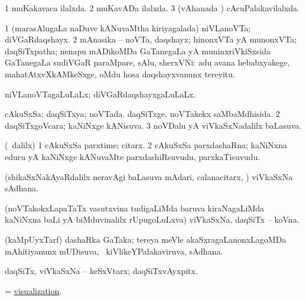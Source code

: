 \bentry
{} 
\gl{\gu}
\expl{}
\bmng
\bnum
\num{1} muKakavaca ilalxda. 
\num{2} muKavADa ilalxda. 
\num{3} (vAhanada \vi) cAcuPalakavilalxda. 
\enum
\emng
\eentry

\bentry 
{} 
\gl{\nA}
\expl{}
\bmng
\bnum
\num{1} (marasAlugaLa naDuve kANuvaMtha kiriyagalada) niVLanoVTa; diVGaRdaqshayx. 
\num{2} mAnasika -- noVTa, daqshayx; hinonxVTa yA munonxVTa; daqSiTxpatha; nenapu mADikoMDa GaTanegaLa yA muninxriVkiSxsida GaTanegaLa sudiVGaR paraMpare, sAlu, sherxVNi:  adu avana hebabxyakege, mahatAtxvXkAMkeSxge, oMdu hosa daqshayxvanunx tereyitu. 
\enum
\emng
\eentry

\bentry 
{} 
\gl{\gu}
\expl{}
\bmng
 niVLanoVTagaLuLaLx; diVGaRdaqshayxgaLuLaLx. 
\emng
\eentry

\bentry 
{} 
\gl{\gu}
\expl{}
\bmng
\bnum
{} cAkuSxSa: 
\banum
{} daqSiTxya; noVTada. 
 daqSiTxge, noVTakekx saMbaMdhisida. 
\eanum
\numie
\num{2} daqSiTxgoVcara; kaNiNxge kANisuva. 
\num{3} noVDalu yA viVkaSxNadalilx baLasuva. 
\enum
\emng
\eentry

\bentry 
{} 
\gl{\nA}
\expl{}
\bmng
 (\sA\ \bava dalilx) 
\bnum
\num{1} cAkuSxSa parxtime; citarx. 
\num{2} cAkuSxSa parxdashaRna; kaNiNxna eduru yA kaNiNxge kANuvaMte parxdashiRsuvudu, parxkaTisuvudu. 
\enum
\emng
\eentry

\bentry
{}
\gl{\nA}
\expl{}
\bmng
 (shikaSxNakAyaRdalilx neravAgi baLasuva mAdari, calanacitarx, \mo) viVkaSxNa sAdhana. 
\emng
\eentry

\bentry 
{} 
\gl{\nA}
\expl{}
\bmng
 (noVTakokxLapaTaTx vasutxvina tudigaLiMda baruva kiraNagaLiMda kaNiNxna baLi yA biMduvinalilx rUpugoLuLxva) viVkaSxNa, daqSiTx -- koVna. 
\emng
\eentry

\bentry 
{} 
\gl{\nA}
\expl{}
\bmng
 (kaMpUyxTarf) dashaRka GaTaka; tereya meVle akaSxragaLanonxLagoMDa mAhitiyanunx mUDisuva, \sA\ kiVlikeYPalakaviruva, sAdhana. 
\emng
\eentry

\bentry
{} 
\gl{\nA}
\expl{}
\bmng
 daqSiTx, viVkaSxNa -- keSxVtarx; daqSiTxvAyxpitx. 
\emng
\eentry

\bentry 
{} 
\gl{\nA}
\expl{}
\bmng
 = \hyperlink{visualization}{visualization}. 
\emng
\eentry

